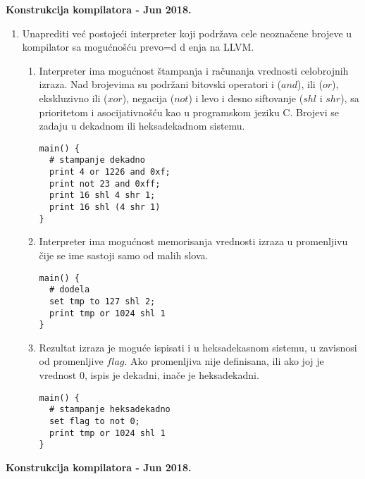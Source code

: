 \documentclass[a4paper]{article}
\def\dj{\leavevmode\setbox0=\hbox{d}\kern0pt
 \rlap{\kern.215em\raise.46\ht0\hbox{-}}d}
\begin{document}
\begin{center}
\textbf{Konstrukcija kompilatora - Jun 2018.}\\
\end{center}

\begin{enumerate}

\item Unaprediti ve\' c postoje\' ci interpreter koji podr\v zava cele
  neozna\v cene brojeve u kompilator sa mogu\' cno\v s\' cu prevo\dj
  enja na LLVM.

\begin{enumerate}

\item Interpreter ima mogu\' cnost \v stampanja i ra\v cunanja
  vrednosti celobrojnih izraza. Nad brojevima su podr\v zani bitovski
  operatori i ($and$), ili ($or$), ekskluzivno ili ($xor$), negacija
  ($not$) i levo i desno siftovanje ($shl$ i $shr$), sa prioritetom i
  asocijativno\v s\' cu kao u programskom jeziku C. Brojevi se zadaju
  u dekadnom ili heksadekadnom sistemu.

\begin{verbatim}
main() {
  # stampanje dekadno
  print 4 or 1226 and 0xf;
  print not 23 and 0xff;
  print 16 shl 4 shr 1;
  print 16 shl (4 shr 1)
}
\end{verbatim}

\item Interpreter ima mogu\' cnost memorisanja vrednosti izraza u
  promenljivu \v cije se ime sastoji samo od malih slova.
\begin{verbatim}
main() {
  # dodela
  set tmp to 127 shl 2;
  print tmp or 1024 shl 1
}
\end{verbatim}

\item Rezultat izraza je mogu\' ce ispisati i u heksadekasnom sistemu,
  u zavisnosi od promenljive $flag$. Ako promenljiva nije definisana,
  ili ako joj je vrednost 0, ispis je dekadni, ina\v ce je
  heksadekadni.

\begin{verbatim}
main() {
  # stampanje heksadekadno
  set flag to not 0;
  print tmp or 1024 shl 1
}
\end{verbatim}

\end{enumerate}

\end{enumerate}

\vskip 1cm

\begin{center}
\textbf{Konstrukcija kompilatora - Jun 2018.}\\
\end{center}
\end{document}
